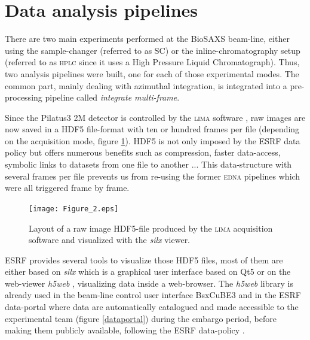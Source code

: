 \documentclass[preprint]{iucr}              %
\begin{document}
\section{Data analysis pipelines}
\label{pipeline}
There are two main experiments performed at the BioSAXS beam-line, either using the sample-changer (referred to as SC) or the inline-chromatography setup (referred to as \textsc{hplc} since it uses a High Pressure Liquid Chromatograph).
Thus, two analysis pipelines were built, one for each of those experimental modes.
The common part, mainly dealing with azimuthal integration, is integrated into a pre-processing pipeline called \textit{integrate multi-frame}.

Since the Pilatus3 2M detector is controlled by the \textsc{lima} software \cite{lima}, raw images are now saved in a HDF5 file-format \cite{hdf5} with ten or hundred frames per file (depending on the acquisition mode, figure \ref{lima}).
HDF5 is not only imposed by the ESRF data policy  \cite{data-policy} but offers numerous benefits such as compression, faster data-access, symbolic links to datasets from one file to another ...
This data-structure with several frames per file prevents us from re-using the former \textsc{edna} pipelines which were  all triggered frame by frame.

\begin{figure}
     \caption{Layout of a raw image HDF5-file produced by the \textsc{lima} acquisition software and visualized with the \textit{silx} viewer.}
     \texttt{[image: Figure\_2.eps]}
     \label{lima}
\end{figure}

ESRF provides several tools to visualize those HDF5 files, most of them are either based on \textit{silx} \cite{silx} which is a graphical user interface based on Qt5 \cite{pyqt} or on the web-viewer \textit{h5web} \cite{h5web}, visualizing data inside a web-browser.
The \textit{h5web} library is already used in the beam-line control user interface BsxCuBE3 \cite{bm29_2022} and in the ESRF data-portal \cite{data-portal} where data are automatically catalogued and made accessible to the experimental team (figure \ref{dataportal}) during the embargo period, before making them publicly available, following the ESRF data-policy \cite{data-policy}. 
\end{document}
